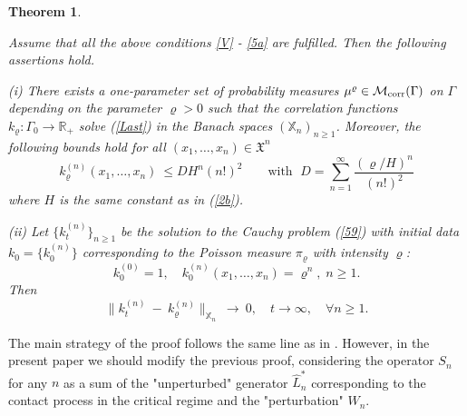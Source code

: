 \documentclass[a4paper,12pt]{article}
\newtheorem{theorem}{Theorem}[section]
\newcommand{\Ga}{\Gamma}
\newcommand{\XX}{{\mathbb X}}
\newcommand{\R}{{\mathbb R}}
\newcommand{\XXX}{{\mathfrak{X}}}
\begin{document}
\begin{theorem}\label{main} {\it Assume that all the above conditions \eqref{V} - \eqref{5a} are fulfilled.
Then the following assertions hold.

{(i)} There exists a one-parameter set of probability measures $\mu^{\varrho} \in {\cal M}_{\rm{corr}}(\Gamma)$ on $\Ga$  depending on the parameter $\varrho >0$ such that the
correlation functions $k_{\varrho}: \Ga_{0}\to\R_{+}$ solve (\ref{Last})  in the Banach spaces $(\XX_{n})_{n\geq 1}$.
Moreover, the following bounds hold for all $(x_1, \ldots, x_n)\in {\XXX}^{n}$
\begin{equation}\label{estimate}
k^{(n)}_\varrho (x_1, \ldots, x_n) \ \le   D  {H}^n (n!)^2 \qquad \text{with } \; D = \sum\limits_{n=1}^{\infty} \frac{(\varrho/ H)^n}{(n!)^2}
\end{equation}
where $H$ is the same constant as in  (\ref{2b}).


{(ii)} Let $\{k_{ t}^{(n)}\}_{n\geq 1}$ be the
solution to the Cauchy problem (\ref{59}) with
 initial data $k_0 = \{k_0^{(n)} \}$ corresponding to the Poisson measure $\pi_\varrho$ with intensity $\varrho$:
\begin{equation}\label{k0}
k_0^{(0)}= 1, \quad k_0^{(n)}(x_1, \ldots, x_n) = \varrho^n,  \; n\ge 1.
\end{equation}
Then
\begin{equation}\label{Th1-2}
\| k_{t}^{(n)} \ - \ k_\varrho^{(n)} \|_{\XX_n} \ \to \ 0, \quad t \to \infty, \quad \forall n\geq 1.
\end{equation}
}
\end{theorem}

\medskip
The main strategy of the proof follows the same line as in \cite{PZ-EJP}. However, in the present paper we should modify the previous proof, considering the operator $S_n$ for any $n$ as a sum of the "unperturbed" generator $\hat L_n^{\ast}$ corresponding to the contact process in the critical regime and the "perturbation" $W_n$.
\end{document}
